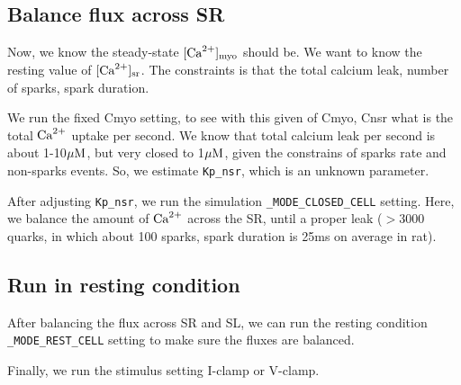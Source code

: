 \subsection{Balance flux across SR}

Now, we know the steady-state $[{\text{Ca}^{2+}}]_{\text{myo}}$ should be. We want to know the
resting value of $[{\text{Ca}^{2+}}]_{\text{sr}}$. The constraints is that the total calcium leak,
number of sparks, spark duration. 

We run the fixed Cmyo setting, to see with this given of Cmyo, Cnsr what is the
total ${\text{Ca}^{2+}}$ uptake per second. We know that total calcium leak per second is
about 1-10${\mu\text{M}}$, but very closed to 1${\mu\text{M}}$, given the constrains of sparks
rate and non-sparks events. So, we estimate \verb!Kp_nsr!, which is an unknown
parameter.

After adjusting \verb!Kp_nsr!, we run the simulation \verb!_MODE_CLOSED_CELL!
setting. Here, we balance the amount of ${\text{Ca}^{2+}}$ across the SR, until a proper leak
($>3000$ quarks, in which about 100 sparks, spark duration is 25ms on average
in rat). 

\subsection{Run in resting condition}


After balancing the flux across SR and SL, we can run the resting condition
\verb!_MODE_REST_CELL! setting to make sure the fluxes are balanced. 

Finally, we run the stimulus setting I-clamp or V-clamp. 

 



